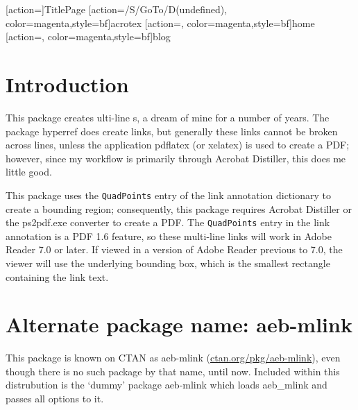 \documentclass{article}
\let\pkg\textsf
\let\app\textsf
\begin{document}
\maketitle

[action={}]{TitlePage}
[action={/S/GoTo/D(undefined)},%
  color=magenta,style={bf}]{acrotex}
[action={},%
  color=magenta,style={bf}]{home}
[action={},%
  color=magenta,style={bf}]{blog}



\tableofcontents


\section{Introduction}

This package creates ulti-line s, a dream of mine
for a number of years. The package \pkg{hyperref} does create links,
but generally these links cannot be broken across lines, unless the
application \app{pdflatex} (or \app{xelatex}) is used to create a PDF;
however, since my workflow is primarily through \app{Acrobat Distiller}, this
does me little good.

This package uses the \texttt{QuadPoints} entry of the link annotation
dictionary to create a bounding region; consequently, this package
requires\marginpar{\small\raggedright\flushright \app{Distiller} or
\app{ps2pdf} required} \app{Acrobat Distiller} or the \app{ps2pdf.exe}
converter to create a PDF. The \texttt{QuadPoints} entry in the link
annotation is a PDF 1.6 feature, so these multi-line links will work in
\app{Adobe Reader} 7.0 or later. If viewed in a version of \app{Adobe Reader}
previous to 7.0, the viewer will use the underlying bounding box, which is the
smallest rectangle containing the link text.

\section{Alternate package name: \texorpdfstring{\protect\pkg{aeb-mlink}}{aeb-mlink}}

This package is known on CTAN as \pkg{aeb-mlink}
(\href{http://www.ctan.org/pkg/aeb-mlink}{ctan.org/pkg/aeb-mlink}), even
though there is no such package by that name, until now. Included within this distrubution
is the `dummy' package \pkg{aeb-mlink} which loads \pkg{aeb\_mlink} and passes all options
to it.
\end{document}
